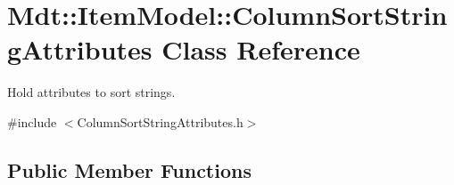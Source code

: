 \hypertarget{class_mdt_1_1_item_model_1_1_column_sort_string_attributes}{}\section{Mdt\+:\+:Item\+Model\+:\+:Column\+Sort\+String\+Attributes Class Reference}
\label{class_mdt_1_1_item_model_1_1_column_sort_string_attributes}


Hold attributes to sort strings.  




{\ttfamily \#include $<$Column\+Sort\+String\+Attributes.\+h$>$}

\subsection*{Public Member Functions}
